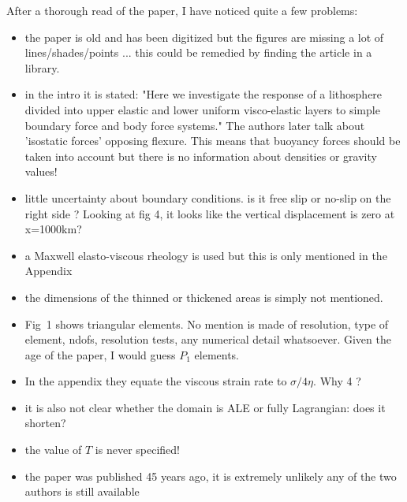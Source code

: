 After a thorough read of the paper, I have noticed quite a few problems:
\begin{itemize}
\item the paper is old and has been digitized but the figures are missing a lot of lines/shades/points ... this could be remedied by finding the article in a library.
\item in the intro it is stated: "Here we investigate the response of a lithosphere divided into upper elastic and lower uniform visco-elastic layers to simple boundary force and body force systems." The authors later talk about 'isostatic forces' opposing flexure. This means that buoyancy forces should be taken into account but there is no information about densities or gravity values!
\item little uncertainty about boundary conditions. is it free slip or no-slip on the right side ? Looking at fig 4, it looks like the vertical displacement is zero at x=1000km?
\item a Maxwell elasto-viscous rheology is used but this is only mentioned in the Appendix
\item the dimensions of the thinned or thickened areas is simply not mentioned. 
\item Fig~1 shows triangular elements. No mention is made of resolution, type of element, ndofs, resolution tests, any numerical detail whatsoever. Given the age of the paper, I would guess $P_1$
elements.
\item In the appendix they equate the viscous strain rate to $\sigma/4\eta$. Why 4 ?
\item it is also not clear whether the domain is ALE or fully Lagrangian: does it shorten?
\item the value of $T$ is never specified!
\item the paper was published 45 years ago, it is extremely unlikely any of the two authors is still available 
\end{itemize}

